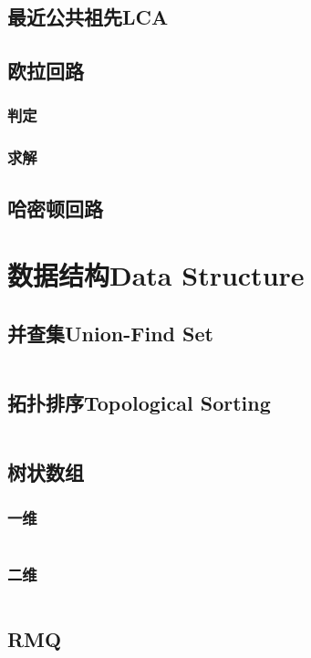 \documentclass[twoside,sub3section,UTF8]{ctexart}						%
\begin{document}
	\subsection{最近公共祖先LCA}


	\subsection{欧拉回路}
		\subsubsection{判定}
		\subsubsection{求解}

	\subsection{哈密顿回路}


\newpage
\section{数据结构Data Structure}
	\subsection{并查集Union-Find Set}
	\inputminted{c++}{"Data Structure/union-find-set.cpp"}
	\subsection{拓扑排序Topological Sorting}
	\inputminted{c++}{"Data Structure/topo.cpp"}
	\subsection{树状数组}
		\subsubsection{一维}
		\inputminted{c++}{"Data Structure/szsz.cpp"}
		\subsubsection{二维}
		\inputminted{c++}{"Data Structure/2Dszsz.cpp"}
	\subsection{RMQ}
\end{document}

